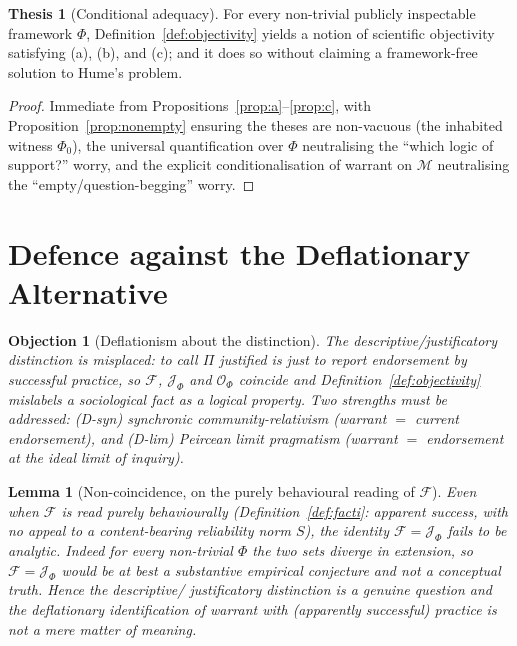 \documentclass{amsart}
\theoremstyle{definition}
\newtheorem{thesis}{Thesis}
\theoremstyle{plain}
\newtheorem{lemma}{Lemma}
\newtheorem{objection}{Objection}
\theoremstyle{remark}
\begin{document}
\begin{thesis}[Conditional adequacy]\label{thesis:adequacy}
For every non-trivial publicly inspectable framework $\Phi$,
Definition~\ref{def:objectivity} yields a notion of scientific objectivity
satisfying (a), (b), and (c); and it does so without claiming a framework-free
solution to Hume's problem.
\end{thesis}

\begin{proof}
Immediate from Propositions~\ref{prop:a}--\ref{prop:c}, with
Proposition~\ref{prop:nonempty} ensuring the theses are non-vacuous (the
inhabited witness $\Phi_0$), the universal quantification over $\Phi$
neutralising the ``which logic of support?'' worry, and the explicit
conditionalisation of warrant on $\mathcal{M}$ neutralising the
``empty/question-begging'' worry.
\end{proof}

\section{Defence against the Deflationary Alternative}

\begin{objection}[Deflationism about the distinction]\label{obj:deflation}
The descriptive/justificatory distinction is misplaced: to call $\Pi$ justified
is just to report endorsement by successful practice, so $\mathcal{F}$,
$\mathcal{J}_\Phi$ and $\mathcal{O}_\Phi$ coincide and
Definition~\ref{def:objectivity} mislabels a sociological fact as a logical
property. Two strengths must be addressed: \emph{(D-syn)} synchronic
community-relativism (warrant $=$ current endorsement), and \emph{(D-lim)}
Peircean limit pragmatism (warrant $=$ endorsement at the ideal limit of
inquiry).
\end{objection}

\begin{lemma}[Non-coincidence, on the purely behavioural reading of
$\mathcal{F}$]\label{lem:noncoincide}
Even when $\mathcal{F}$ is read \emph{purely behaviourally}
(Definition~\ref{def:facti}: apparent success, with \emph{no} appeal to a
content-bearing reliability norm $S$), the identity $\mathcal{F}=\mathcal{J}_\Phi$
fails to be analytic. Indeed for every non-trivial $\Phi$ the two sets diverge
in extension, so $\mathcal{F}=\mathcal{J}_\Phi$ would be at best a substantive
empirical conjecture and not a conceptual truth. Hence the descriptive\slash
justificatory distinction is a genuine question and the deflationary
\emph{identification} of warrant with (apparently successful) practice is not a
mere matter of meaning.
\end{lemma}
\end{document}
